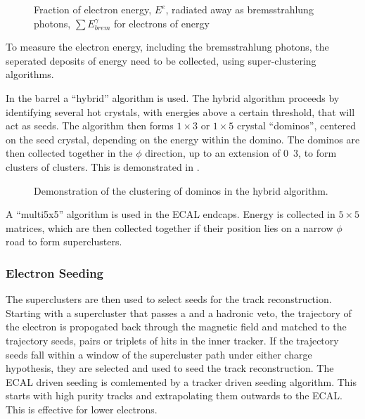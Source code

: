\begin{figure}[htb]
  \centering
  \caption{Fraction of electron energy, $E^{e}$, radiated away as bremsstrahlung
photons, $\sum E_{brem}^{\gamma}$ for electrons of energy }%
  \label{reco:brem}
\end{figure}

To measure the electron energy, including the bremsstrahlung photons, the
seperated deposits of energy need to be collected, using super-clustering
algorithms. 

In the barrel a ``hybrid'' algorithm is used. The hybrid algorithm proceeds by
identifying several hot crystals, with energies above a certain threshold, that
will act as seeds. The algorithm then forms $1\times3$ or $1\times5$ crystal
``dominos'', centered on the seed crystal, depending on the energy within the
domino. The dominos are then collected together in the $\phi$ direction, up to
an extension of \unit{0.3}{\rad}, to form clusters of clusters. This is
demonstrated in .

\begin{figure}[htb]
  \centering
  \caption{Demonstration of the clustering of dominos in the hybrid algorithm.}
  \label{reco:hybrid}
\end{figure}

A ``multi5x5'' algorithm is used in the ECAL endcaps. Energy is collected in
$5\times5$ matrices, which are then collected together if their position lies on
a narrow $\phi$ road to form superclusters.

\subsubsection{Electron Seeding}
The superclusters are then used to select seeds for the track reconstruction.
Starting with a supercluster that passes a \pt and a hadronic veto, the
trajectory of the electron is propogated back through the magnetic field and
matched to the trajectory seeds, pairs or triplets of hits in the inner tracker.
If the trajectory seeds fall within a window of the supercluster path under
either charge hypothesis, they are selected and used to seed the track
reconstruction.
The ECAL driven seeding is comlemented by a tracker driven seeding algorithm.
This starts with high purity tracks and extrapolating them outwards to the ECAL.
This is effective for lower \pt electrons.


